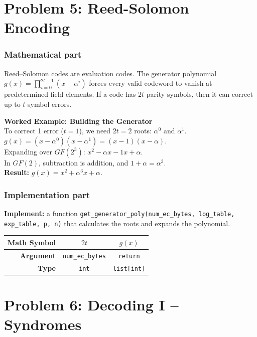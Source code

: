 \documentclass[11pt]{article}
\begin{document}
\section*{Problem 5: Reed-Solomon Encoding}

\subsubsection*{Mathematical part}
Reed--Solomon codes are evaluation codes. The generator polynomial $g(x)=\prod_{i=0}^{2t-1}(x-\alpha^i)$ forces every valid codeword to vanish at predetermined field elements. If a code has $2t$ parity symbols, then it can correct up to $t$ symbol errors.

\textbf{Worked Example: Building the Generator} \\
To correct 1 error ($t=1$), we need $2t = 2$ roots: $\alpha^0$ and $\alpha^1$.
$g(x) = (x - \alpha^0)(x - \alpha^1) = (x - 1)(x - \alpha)$. \\
Expanding over $GF(2^3)$: $x^2 - \alpha x - 1x + \alpha$. \\
In $GF(2)$, subtraction is addition, and $1 + \alpha = \alpha^3$. \\
\textbf{Result:} $g(x) = x^2 + \alpha^3 x + \alpha$.

\subsubsection*{Implementation part}
\textbf{Implement:} a function \lstinline|get_generator_poly(num_ec_bytes, log_table, exp_table, p, n)| that calculates the roots and expands the polynomial.

\begin{center}
\renewcommand{\arraystretch}{2.0}
\begin{tabular}{r | c | c }
\toprule
\textbf{Math Symbol} & $2t$ & $g(x)$ \\ \midrule
\textbf{Argument} & \lstinline|num_ec_bytes| & \lstinline|return| \\ \midrule
\textbf{Type} & \lstinline|int| & \lstinline|list[int]| \\
\bottomrule
\end{tabular}
\end{center}




\section*{Problem 6: Decoding I -- Syndromes}
\end{document}
